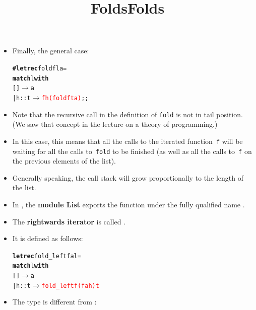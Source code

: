 \documentclass[wide]{slides}
\begin{document}
\begin{slide}
  \title{Folds}

  \begin{itemize}

    \item Finally, the general case:
      \smallskip
\begin{alltt}
\textbf{# let rec} fold f l a =
    \textbf{match} l \textbf{with}
         [] \(\rightarrow\) a
    | h::t \(\rightarrow\) \textcolor{red}{f h (fold f t a)};;
\end{alltt}

\noindent{}

   \item Note that the recursive call in the definition of
     \texttt{fold} is not in tail position.  (We saw that concept in
     the lecture on a theory of programming.)

   \item In this case, this means that all the calls to the iterated
     function~\texttt{f} will be waiting for all the calls
     to~\texttt{fold} to be finished (as well as all the calls
     to~\texttt{f} on the previous elements of the list).

   \item Generally speaking, the call stack will grow proportionally
     to the length of the list.

  \end{itemize}

\end{slide}

\begin{slide}
  \title{Folds}

  \begin{itemize}

    \item In \OCaml, the \textbf{module List} exports the function
       under the fully qualified name
      .

    \item The \textbf{rightwards iterator} is called
      .

    \item It is defined as follows:
      \smallskip
\begin{alltt}
\textbf{let rec} fold\_left f a l =
  \textbf{match} l \textbf{with}
       [] \(\rightarrow\) a
  | h::t \(\rightarrow\) \textcolor{red}{fold\_left f (f a h) t}
\end{alltt}

    \item The type is different from :

\noindent{}

  \end{itemize}

\end{slide}
\end{document}
